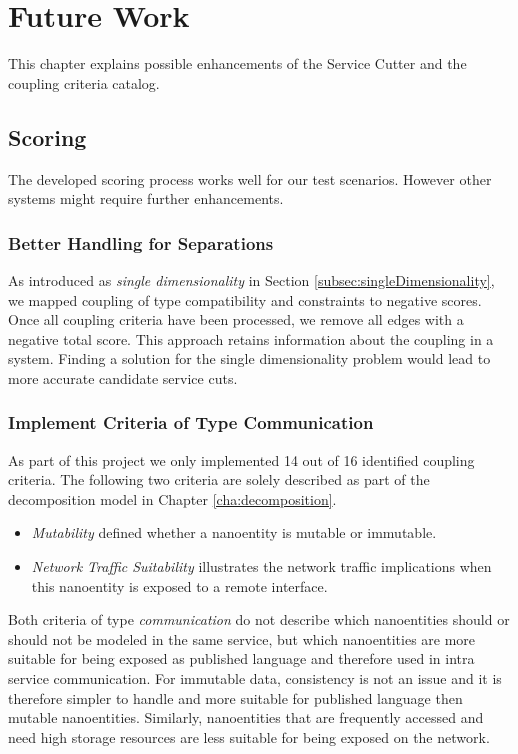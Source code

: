\chapter{Future Work}
\label{cha:futureWork}

This chapter explains possible enhancements of the Service Cutter and the coupling criteria catalog. %

\section{Scoring}

The developed scoring process works well for our test scenarios. However other systems might require further enhancements.

\subsection{Better Handling for Separations}

As introduced as \textit{single dimensionality} in Section \ref{subsec:singleDimensionality}, we mapped coupling of type compatibility and constraints to negative scores. Once all coupling criteria have been processed, we remove all edges with a negative total score. This approach retains information about the coupling in a system. Finding a solution for the single dimensionality problem would lead to more accurate candidate service cuts.

\subsection{Implement Criteria of Type Communication}

As part of this project we only implemented 14 out of 16 identified coupling criteria. The following two criteria are solely described as part of the decomposition model in Chapter \ref{cha:decomposition}.

\begin{itemize}
\item \textit{Mutability} defined whether a nanoentity is mutable or immutable.
\item \textit{Network Traffic Suitability} illustrates the network traffic implications when this nanoentity is exposed to a remote interface.
\end{itemize}

Both criteria of type \textit{communication} do not describe which nanoentities should or should not be modeled in the same service, but which nanoentities are more suitable for being exposed as published language and therefore used in intra service communication. For immutable data, consistency is not an issue and it is therefore simpler to handle and more suitable for published language then mutable nanoentities. Similarly, nanoentities that are frequently accessed and need high storage resources are less suitable for being exposed on the network. 

